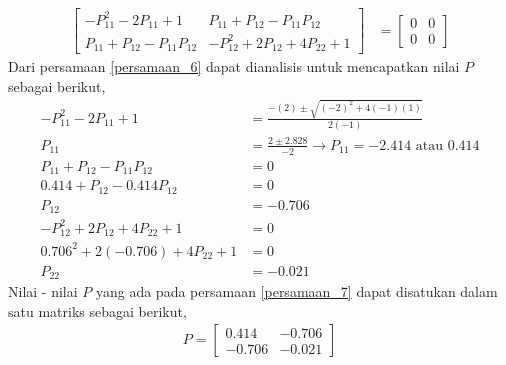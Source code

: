 \documentclass[../main.tex]{subfiles}
\begin{document}
\begin{equation}
\begin{split}
                        \begin{bmatrix} -P_{11}^2 - 2P_{11} + 1 & P_{11} + P_{12} - P_{11} P_{12} \\ P_{11} + P_{12} - P_{11} P_{12} & -P_{12}^2 + 2 P_{12} + 4P_{22} + 1 \end{bmatrix} &= \begin{bmatrix} 0 & 0 \\ 0 & 0 \end{bmatrix}
                        \label{persamaan_6}
                    \end{split}
                \end{equation}
                Dari persamaan \eqref{persamaan_6} dapat dianalisis untuk mencapatkan nilai $P$ sebagai berikut,
                \begin{equation}
                    \begin{split}
                        -P_{11}^2-2P_{11}+1 &= \frac{-(2) \pm \sqrt{(-2)^2 + 4(-1)(1)}}{2(-1)}\\[5pt]
                        P_{11} &= \frac{2 \pm 2.828}{-2} \rightarrow P_{11} = -2.414 \text{ atau } 0.414 \\[10pt]
                        P_{11} + P_{12} - P_{11} P_{12} &= 0 \\[5pt]
                        0.414 + P_{12} - 0.414 P_{12} &=0 \\[5pt]
                        P_{12} &= - 0.706 \\[10pt]
                        -P_{12}^2 + 2P_{12} + 4P_{22} + 1 &= 0 \\[5pt]
                        0.706^2 + 2(-0.706) + 4P_{22} + 1 &= 0 \\[5pt]
                        P_{22} &= -0.021
                        \label{persamaan_7}
                    \end{split}
                \end{equation}
                Nilai - nilai $P$ yang ada pada persamaan \eqref{persamaan_7} dapat disatukan dalam satu matriks sebagai berikut,
                \begin{equation}
                    \begin{split}
                        P = \begin{bmatrix} 0.414 & -0.706 \\ -0.706 & -0.021 \end{bmatrix}
                        \label{persamaan_8}
                    \end{split}
                \end{equation}
\end{document}

